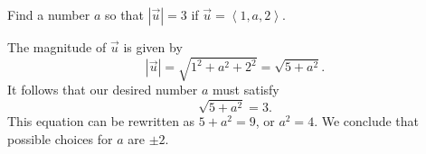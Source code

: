 \documentclass[]{ximera}
\begin{document}
\begin{problem}
Find a number $a$ so that $\left|\vec{u}\right| = 3$ if $\vec{u} = \left<1,a,2\right>$. 

\begin{solution}
The magnitude of $\vec{u}$ is given by
$$
\left|\vec{u}\right| = \sqrt{1^2 + a^2 + 2^2} = \sqrt{5 + a^2}.
$$
It follows that our desired number $a$ must satisfy
$$
\sqrt{5 + a^2} = 3.
$$
This equation can be rewritten as $5 + a^2 = 9$, or $a^2 = 4$. We conclude that possible choices for $a$ are $\pm 2$. 
\end{solution}
\end{problem}
\end{document}
